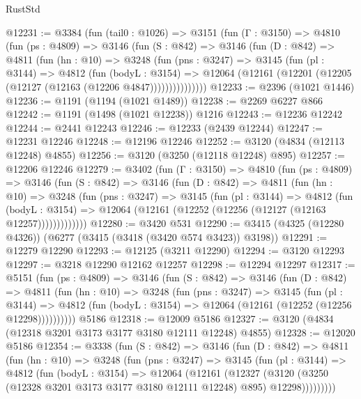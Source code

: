 \begin{lexlean}{RustStd}
\begin{coremodule}
@12231 := @3384
    (fun (tail0 : @1026) =>
    @3151
      (fun (Γ : @3150) =>
      @4810
        (fun (ps : @4809) =>
        @3146
          (fun (S : @842) =>
          @3146
            (fun (D : @842) =>
            @4811
              (fun (hn : @10) =>
              @3248
                (fun (pns : @3247) =>
                @3145
                  (fun (pl : @3144) =>
                  @4812
                    (fun (bodyL : @3154) =>
                    @12064 (@12161 (@12201 (@12205 (@12127 (@12163 (@12206 @4847)))))))))))))))
@12233 := @2396 (@1021 @1446)
@12236 := @1191 (@1194 (@1021 @1489))
@12238 := @2269 @6227 @866
@12242 := @1191 (@1498 (@1021 @12238)) @1216
@12243 := @12236 @12242
@12244 := @2441 @12243
@12246 := @12233 (@2439 @12244)
@12247 := @12231 @12246
@12248 := @12196 @12246
@12252 := @3120 (@4834 (@12113 @12248) @4855)
@12256 := @3120 (@3250 (@12118 @12248) @895)
@12257 := @12206 @12246
@12279 := @3402
    (fun (Γ : @3150) =>
    @4810
      (fun (ps : @4809) =>
      @3146
        (fun (S : @842) =>
        @3146
          (fun (D : @842) =>
          @4811
            (fun (hn : @10) =>
            @3248
              (fun (pns : @3247) =>
              @3145
                (fun (pl : @3144) =>
                @4812
                  (fun (bodyL : @3154) =>
                  @12064 (@12161 (@12252 (@12256 (@12127 (@12163 @12257)))))))))))))
@12280 := @3420 @531
@12290 := @3415 (@4325 (@12280 @4326)) (@6277 (@3415 (@3418 (@3420 @574 @3423)) @3198))
@12291 := @12279 @12290
@12293 := @12125 (@3211 @12290)
@12294 := @3120 @12293
@12297 := @3218 @12290 @12162 @12257
@12298 := @12294 @12297
@12317 := @5151
    (fun (ps : @4809) =>
    @3146
      (fun (S : @842) =>
      @3146
        (fun (D : @842) =>
        @4811
          (fun (hn : @10) =>
          @3248
            (fun (pns : @3247) =>
            @3145
              (fun (pl : @3144) =>
              @4812 (fun (bodyL : @3154) => @12064 (@12161 (@12252 (@12256 @12298))))))))))
    @5186
@12318 := @12009 @5186
@12327 := @3120 (@4834 (@12318 @3201 @3173 @3177 @3180 @12111 @12248) @4855)
@12328 := @12020 @5186
@12354 := @3338
    (fun (S : @842) =>
    @3146
      (fun (D : @842) =>
      @4811
        (fun (hn : @10) =>
        @3248
          (fun (pns : @3247) =>
          @3145
            (fun (pl : @3144) =>
            @4812
              (fun (bodyL : @3154) =>
              @12064
                (@12161
                  (@12327
                    (@3120
                      (@3250 (@12328 @3201 @3173 @3177 @3180 @12111 @12248) @895)
                      @12298)))))))))

\end{coremodule}
\end{lexlean}
